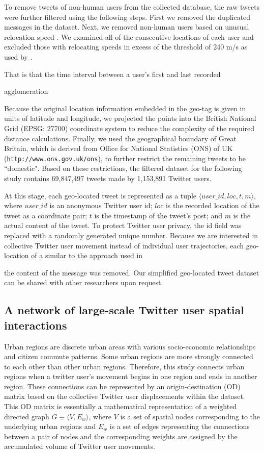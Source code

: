 \documentclass[]{tGIS2e}
\begin{document}
To remove tweets of non-human users from the collected database, the raw tweets were further filtered using the following steps.
First we removed the duplicated messages in the dataset.
Next, we removed non-human users based on unusual relocation speed \citep{hawelka,jurdak2015}. 
We examined all of the consecutive locations of each user and excluded those with relocating speeds in excess of the threshold of 240 m/s as used by \citep{jurdak2015}. 

That is that the time interval between a user's first and last recorded 

 agglomeration





Because the original location information embedded in the geo-tag is given in units of latitude and longitude, we projected the points into the British National Grid (EPSG: 27700) coordinate system to reduce the complexity of the required distance calculations. 
Finally, we used the geographical boundary of Great Britain, which is derived from Office for National Statistics (ONS) of UK ({\tt{http://www.ons.gov.uk/ons}}), to further restrict the remaining tweets to be ``domestic".
Based on these restrictions, the filtered dataset for the following study contains 69,847,497 tweets made by 1,153,891 Twitter users.

At this stage, each geo-located tweet is represented as a tuple $\langle user\_id, loc, t, m \rangle$, where $user\_id$ is an anonymous Twitter user id; $loc$ is the recorded location of the tweet as a coordinate pair; $t$ is the timestamp of the tweet's post; and $m$ is the actual content of the tweet. 
To protect Twitter user privacy, the id field was replaced with a randomly generated unique number. 
Because we are interested in collective Twitter user movement instead of individual user trajectories,
each geo-location of a
similar to the approach used in

the content of the message was removed. 
Our simplified geo-located tweet dataset can be shared with other researchers upon request.

\subsection{A network of large-scale Twitter user spatial interactions}
Urban regions are discrete urban areas with various socio-economic relationships and citizen commute patterns. 
Some urban regions are more strongly connected to each other than other urban regions.
Therefore, this study connects urban regions when a twitter user's movement begins in one region and ends in another region.
These connections can be represented by an origin-destination (OD) matrix based on the collective Twitter user displacements within the dataset.
This OD matrix is essentially a mathematical representation of a weighted directed graph $G\equiv\langle V, E_{w}\rangle$, where $V$ is a set of spatial nodes corresponding to the underlying urban regions and $E_{w}$ is a set of edges representing the connections between a pair of nodes and the corresponding weights are assigned by the accumulated volume of Twitter user movements.
\end{document}
